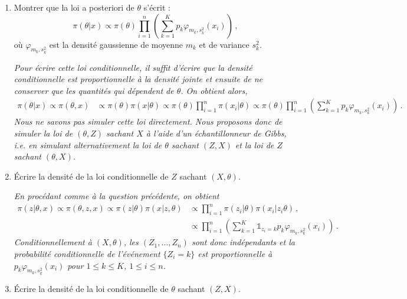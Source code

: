 \documentclass[a4paper,10pt,fleqn]{article}
\newcommand{\1}{\ensuremath{\mathbbm{1}}}
\begin{document}
\begin{enumerate}
\item Montrer que la loi a posteriori de $\theta$ s'\'ecrit :
$$
\pi(\theta|x) \propto \pi(\theta)\prod_{i=1}^n\left(\sum_{k=1}^Kp_k \varphi_{m_k,s_k^2}(x_i)\right)\,,
$$
o\`u $\varphi_{m_k,s_k^2}$ est la densit\'e gaussienne de moyenne $m_k$ et de variance $s_k^2$.

\vspace{.2cm}

{\em
Pour \'ecrire cette loi conditionnelle, il suffit d'\'ecrire que la densit\'e conditionnelle est proportionnelle \`a la densit\'e jointe et ensuite de ne conserver que les quantit\'es qui d\'ependent de $\theta$. On obtient alors,
\begin{align*}
\pi(\theta|x)\propto \pi(\theta,x) &\propto \pi(\theta) \pi(x|\theta)\propto \pi(\theta) \prod_{i=1}^n\pi(x_i|\theta)\propto \pi(\theta) \prod_{i=1}^n\left(\sum_{k=1}^Kp_k\varphi_{m_k,s_k^2}(x_i)\right)\,.
\end{align*}
Nous ne savons pas simuler cette loi directement. Nous proposons donc de simuler la loi de $(\theta,Z)$ sachant $X$ \`a l'aide d'un \'echantillonneur de Gibbs, i.e. en simulant alternativement la loi de $\theta$ sachant $(Z,X)$ et la loi de $Z$ sachant $(\theta,X)$.
}
\item \'Ecrire la densit\'e de la loi conditionnelle de $Z$ sachant $(X,\theta)$.

\vspace{.2cm}

{\em
En proc\'edant comme \`a la question pr\'ec\'edente, on obtient
\begin{align*}
\pi(z|\theta,x)\propto \pi(\theta,z,x) \propto \pi(z|\theta) \pi(x|z,\theta)&\propto \prod_{i=1}^n\pi(z_i|\theta)\pi(x_i|z_i\theta)\,,\\
&\propto \prod_{i=1}^n\left(\sum_{k=1}^K\mathds{1}_{z_i=k}p_k\varphi_{m_k,s_k^2}(x_i)\right)\,.
\end{align*}
Conditionnellement \`a $(X,\theta)$, les $(Z_1,\ldots,Z_n)$ sont donc ind\'ependants et la probabilit\'e conditionnelle de l'\'ev\'enement $\{Z_i=k\}$ est proportionnelle \`a $p_k\varphi_{m_k,s_k^2}(x_i)$ pour $1\leq k \leq K$, $1\leq i \leq n$.
}
\item \'Ecrire la densit\'e de la loi conditionnelle de $\theta$ sachant $(Z,X)$.

\vspace{.2cm}


\end{enumerate}
\end{document}
